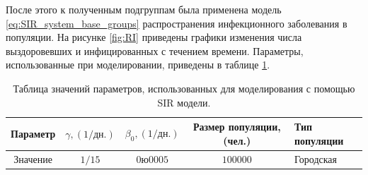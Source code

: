 \documentclass[14pt,a4paper]{article}
\begin{document}
После этого к полученным подгруппам была применена модель \eqref{eq:SIR_system_base_groups} распространения инфекционного заболевания в популяции. На рисунке \ref{fig:RI} приведены графики изменения числа выздоровевших и инфицированных с течением времени. Параметры, использованные при моделировании, приведены в таблице \ref{tab:param_th}.

\begin{table}[h!]
	\centering
	\caption{Таблица значений параметров, использованных для  моделирования с помощью SIR модели.}
	\begin{tabularx}{\textwidth}{|c|c|c|c|X|}
		\hline
		Параметр & $\gamma,  (1/\text{дн.})$ & $\beta_0,  (1/\text{дн.})$ & Размер популяции, (чел.)& Тип популяции \\
		\hline
		Значение & $1/15$ & $0ю0005$ & $100000$ & Городская \\
		\hline
	\end{tabularx}
	
	\label{tab:param_th}
\end{table}
\end{document}
